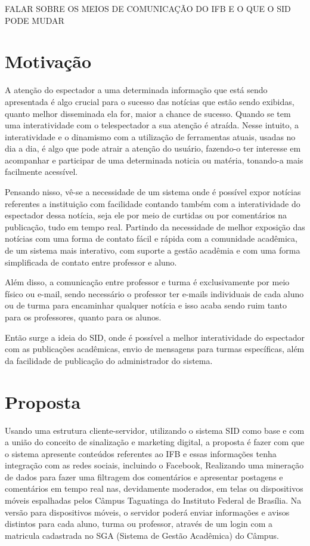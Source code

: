 FALAR SOBRE OS MEIOS DE COMUNICAÇÃO DO IFB E O QUE O SID PODE MUDAR

\section{Motivação}
A atenção do espectador a uma determinada informação que está sendo apresentada é algo crucial para o sucesso das notícias que estão sendo exibidas, quanto melhor disseminada ela for, maior a chance de sucesso. Quando se tem uma interatividade com o telespectador a sua atenção é atraída. Nesse intuito, a interatividade e o dinamismo com a utilização de ferramentas atuais, usadas no dia a dia, é algo que pode atrair a atenção do usuário, fazendo-o ter interesse em acompanhar e participar de uma determinada noticia ou matéria, tonando-a mais facilmente acessível. 

Pensando nisso, vê-se a necessidade de um sistema onde é possível expor notícias referentes a instituição com facilidade contando também com a interatividade do espectador dessa notícia, seja ele por meio de curtidas ou por comentários na publicação, tudo em tempo real. Partindo da necessidade de melhor exposição das notícias com uma forma de contato fácil e rápida com a comunidade acadêmica, de um sistema mais interativo, com suporte a gestão acadêmia e com uma forma simplificada de contato entre professor e aluno. 

Além disso, a comunicação entre professor e turma é exclusivamente por meio físico ou e-mail, sendo necessário o professor ter e-mails individuais de cada aluno ou de turma para encaminhar qualquer notícia e isso acaba sendo ruim tanto para os professores, quanto para os alunos. 

Então surge a ideia do SID, onde é possível a melhor interatividade do espectador com as publicações acadêmicas, envio de mensagens para turmas específicas, além da facilidade de publicação do administrador do sistema.

\section{Proposta}
Usando uma estrutura cliente-servidor, utilizando o sistema SID como base e com a união do conceito de sinalização e marketing digital, a proposta é fazer com que o sistema apresente conteúdos referentes ao IFB e essas informações tenha integração com as redes sociais, incluindo o Facebook, Realizando uma mineração de dados para fazer uma filtragem dos comentários e apresentar postagens e comentários em tempo real nas, devidamente moderados, em telas ou dispositivos móveis espalhadas pelos Câmpus Taguatinga do Instituto Federal de Brasília. Na versão para dispositivos móveis, o servidor poderá enviar informações e avisos distintos para cada aluno, turma ou professor, através de um login com a matricula cadastrada no SGA (Sistema de Gestão Acadêmica) do Câmpus.

